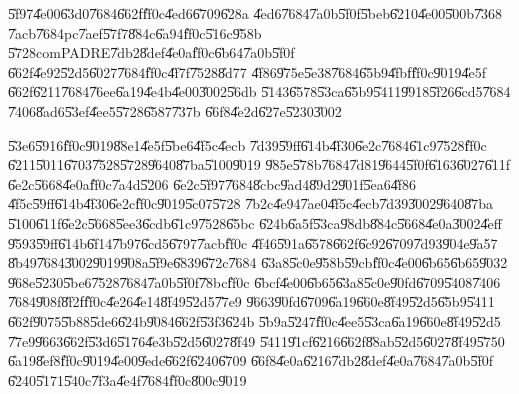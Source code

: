\documentclass[12pt,a4paper]{article}
\begin{document}
\U{5f97}\U{4e00}\U{63d0}\U{7684}\U{662f}\U{ff0c}\U{4ed6}\U{6709}\U{628a}%
\U{4ed6}\U{7684}\U{7a0b}\U{5f0f}\U{5beb}\U{6210}\U{4e00}\U{500b}\U{7368}%
\U{7acb}\U{7684}pc\U{7aef}\U{57f7}\U{884c}\U{6a94}\U{ff0c}\U{516c}\U{958b}%
\U{5728}comPADRE\U{7db2}\U{8def}\U{4e0a}\U{ff0c}\U{6b64}\U{7a0b}\U{5f0f}%
\U{662f}\U{4e92}\U{52d5}\U{6027}\U{7684}\U{ff0c}\U{4f7f}\U{7528}\U{8d77}%
\U{4f86}\U{975e}\U{5e38}\U{7684}\U{65b9}\U{4fbf}\U{ff0c}\U{9019}\U{4e5f}%
\U{662f}\U{6211}\U{7684}\U{76ee}\U{6a19}\U{4e4b}\U{4e00}\U{3002}\U{56db}%
\U{5143}\U{6578}\U{53ca}\U{65b9}\U{5411}\U{9918}\U{5f26}\U{6cd5}\U{7684}%
\U{7406}\U{8ad6}\U{53ef}\U{4ee5}\U{5728}\cite{rapaport}\U{6587}\U{737b}%
\U{66f8}\U{4e2d}\U{627e}\U{5230}\U{3002}

\bigskip

\U{53e6}\U{5916}\U{ff0c}\U{9019}\U{88e1}\U{4e5f}\U{5be6}\U{4f5c}\U{4ecb}%
\U{7d39}\U{59ff}\U{614b}\U{4f30}\U{6e2c}\U{7684}\U{61c9}\U{7528}\U{ff0c}%
\U{6211}\U{5011}\U{6703}\U{7528}\U{5728}\U{9640}\U{87ba}\U{5100}\U{9019}%
\U{985e}\U{578b}\U{7684}\U{7d81}\U{9644}\U{5f0f}\U{6163}\U{6027}\U{611f}%
\U{6e2c}\U{5668}\cite[Ch 3.6.4]{titterton}\U{4e0a}\U{ff0c}\U{7a4d}\U{5206}%
\U{6e2c}\U{5f97}\U{7684}\U{8cbc}\U{9ad4}\U{89d2}\U{901f}\U{5ea6}\U{4f86}%
\U{4f5c}\U{59ff}\U{614b}\U{4f30}\U{6e2c}\U{ff0c}\U{9019}\U{5c07}\U{5728}%
\U{7b2c}\U{4e94}\U{7ae0}\U{4f5c}\U{4ecb}\U{7d39}\U{3002}\U{9640}\U{87ba}%
\U{5100}\U{611f}\U{6e2c}\U{5668}\U{5ee3}\U{6cdb}\U{61c9}\U{7528}\U{65bc}%
\U{624b}\U{6a5f}\U{53ca}\U{98db}\U{884c}\U{5668}\U{4e0a}\U{3002}\U{4eff}%
\U{9593}\U{59ff}\U{614b}\U{6f14}\U{7b97}\U{6cd5}\U{6797}\U{7acb}\U{ff0c}%
\U{4f46}\U{591a}\U{6578}\U{662f}\U{6c92}\U{6709}\U{7d93}\U{904e}\U{9a57}%
\U{8b49}\U{7684}\U{3002}\U{9019}\U{908a}\U{5f9e}\U{6839}\U{672c}\U{7684}%
\U{63a8}\U{5c0e}\U{958b}\U{59cb}\U{ff0c}\U{4e00}\U{6b65}\U{6b65}\U{9032}%
\U{968e}\U{5230}\U{5be6}\U{7528}\U{7684}\U{7a0b}\U{5f0f}\U{78bc}\U{ff0c}%
\U{6bcf}\U{4e00}\U{6b65}\U{63a8}\U{5c0e}\U{90fd}\U{6709}\U{5408}\U{7406}%
\U{7684}\U{908f}\U{8f2f}\U{ff0c}\U{4e26}\U{4e14}\U{8f49}\U{52d5}\U{77e9}%
\U{9663}\U{90fd}\U{6709}\U{6a19}\U{660e}\U{8f49}\U{52d5}\U{65b9}\U{5411}%
\U{662f}\U{9075}\U{5b88}\U{5de6}\U{624b}\U{9084}\U{662f}\U{53f3}\U{624b}%
\U{5b9a}\U{5247}\U{ff0c}\U{4ee5}\U{53ca}\U{6a19}\U{660e}\U{8f49}\U{52d5}%
\U{77e9}\U{9663}\U{662f}\U{53d6}\U{5176}\U{4e3b}\U{52d5}\U{6027}\U{8f49}%
\U{5411}\U{91cf}\U{6216}\U{662f}\U{88ab}\U{52d5}\U{6027}\U{8f49}\U{5750}%
\U{6a19}\U{8ef8}\U{ff0c}\U{9019}\U{4e00}\U{9ede}\U{662f}\U{6240}\U{6709}%
\U{66f8}\U{4e0a}\U{6216}\U{7db2}\U{8def}\U{4e0a}\U{7684}\U{7a0b}\U{5f0f}%
\U{6240}\U{5171}\U{540c}\U{7f3a}\U{4e4f}\U{7684}\U{ff0c}\U{800c}\U{9019}%
\end{document}
